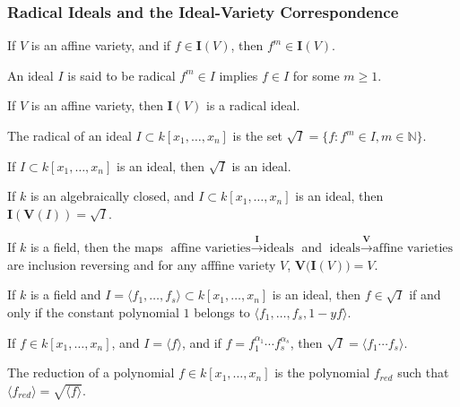 \documentclass[crop=false,class=book]{standalone}
\begin{document}
\subsubsection{Radical Ideals and the Ideal-Variety Correspondence}
\begin{theorem}
If $V$ is an affine variety, and if $f\in \textbf{I}(V)$, then $f^m\in \textbf{I}(V)$.
\end{theorem}
\begin{definition}
An ideal $I$ is said to be radical $f^m \in I$ implies $f\in I$ for some $m\geq 1$.
\end{definition}
\begin{theorem}
If $V$ is an affine variety, then $\textbf{I}(V)$ is a radical ideal.
\end{theorem}
\begin{definition}
The radical of an ideal $I\subset k[x_{1},\hdots,x_{n}]$ is the set $\sqrt{I}=\{f:f^{m}\in I,m\in\mathbb{N}\}$.
\end{definition}
\begin{theorem}
If $I\subset k[x_1,\hdots ,x_n]$ is an ideal, then $\sqrt{I}$ is an ideal.
\end{theorem}
\begin{theorem}
If $k$ is an algebraically closed, and $I\subset k[x_1,\hdots ,x_n]$ is an ideal, then $\textbf{I}(\mathbf{V}(I))=\sqrt{I}$.
\end{theorem}
\begin{theorem}
If $k$ is a field, then the maps $\textrm{affine varieties} \overset{\textbf{I}}\rightarrow \textrm{ideals}$ and $\textrm{ideals} \overset{\mathbf{V}}\rightarrow \textrm{affine varieties}$ are inclusion reversing and for any afffine variety $V$, $\mathbf{V}\big(\textbf{I}(V)\big) = V$.
\end{theorem}
\begin{theorem}
If $k$ is a field and $I=\langle f_1,\hdots, f_s\rangle\subset k[x_1,\hdots ,x_n]$ is an ideal, then $f\in \sqrt{I}$ if and only if the constant polynomial $1$ belongs to $\langle f_1,\hdots, f_s, 1-yf\rangle$.
\end{theorem}
\begin{theorem}
If $f\in k[x_1,\hdots ,x_n]$, and $I = \langle f\rangle$, and if $f = f_1^{\alpha_1}\cdots f_s^{\alpha_s}$, then $\sqrt{I} = \langle f_1\cdots f_s\rangle$.
\end{theorem}
\begin{definition}
The reduction of a polynomial $f\in k[x_1,\hdots ,x_n]$ is the polynomial $f_{red}$ such that $\langle f_{red}\rangle = \sqrt{\langle f\rangle}$.
\end{definition}
\end{document}

